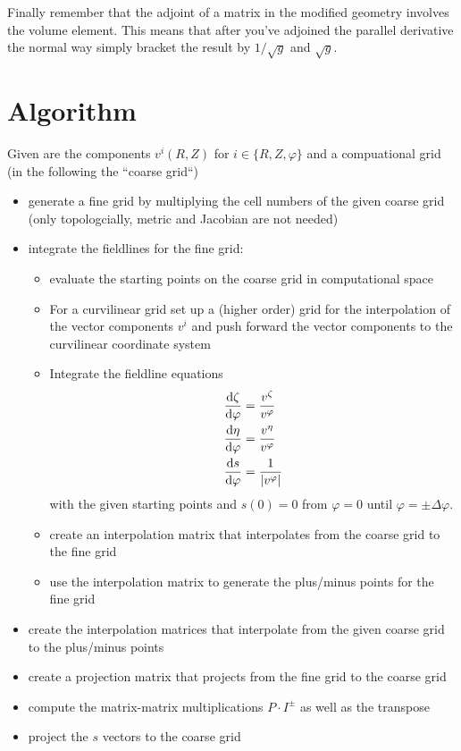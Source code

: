 Finally remember that the adjoint of a matrix in the modified geometry 
involves the volume element. This means that after you've adjoined the 
parallel derivative the normal way simply bracket the result 
by $1/\sqrt{g}$ and $\sqrt{g}$. 


\section{Algorithm}
Given are the components $v^i(R,Z)$ for $i\in\{R,Z,\varphi\}$ and a compuational grid (in the following the ``coarse grid``)
\begin{itemize}
  \item generate a fine grid by multiplying the cell numbers of the given coarse grid (only topologcially, metric and Jacobian are not needed)
  \item integrate the fieldlines for the fine grid:
    \begin{itemize}
      \item evaluate the starting points on the coarse grid in computational space 
      \item For a curvilinear grid set up a (higher order) grid for the 
        interpolation of the vector components $v^i$ and push forward the vector components
        to the curvilinear coordinate system
      \item Integrate the fieldline equations 
\begin{subequations}
\begin{align}
\frac{\mathrm{d} \zeta}{\mathrm{d}\varphi} &= \frac{v^\zeta}{v^\varphi}\\
\frac{\mathrm{d} \eta}{\mathrm{d}\varphi} &= \frac{v^\eta}{v^\varphi}\\
\frac{\mathrm{d} s}{\mathrm{d}\varphi} &= \frac{1}{|v^\varphi|}
\end{align}
\label{eq:fieldlines_converted}
\end{subequations}
    with the given starting points and $s(0)=0$ from $\varphi=0$ until $\varphi = \pm\Delta \varphi$.
      \item create an interpolation matrix that interpolates from the coarse grid 
        to the fine grid
      \item use the interpolation matrix to generate the plus/minus points for the fine grid
    \end{itemize}
  \item create the interpolation matrices that interpolate from the given coarse grid 
    to the plus/minus points 
  \item create a projection matrix that projects from the fine grid to the coarse grid
  \item compute the matrix-matrix multiplications $P\cdot I^\pm$ as well as the transpose
  \item project the $s$ vectors to the coarse grid
\end{itemize}

